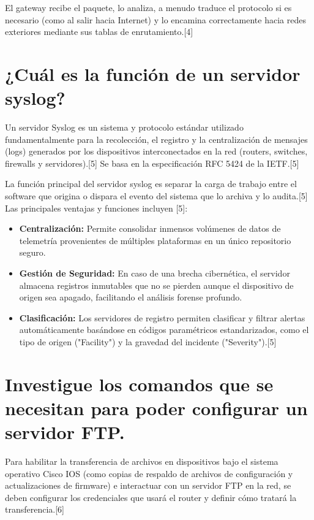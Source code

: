 \documentclass[a4paper,12pt]{article}
\begin{document}
El gateway recibe el paquete, lo analiza, a menudo traduce el protocolo si es necesario (como al salir hacia Internet) y lo encamina correctamente hacia redes exteriores mediante sus tablas de enrutamiento.[4]


\newpage
\section{¿Cuál es la función de un servidor syslog?}

Un servidor Syslog es un sistema y protocolo estándar utilizado fundamentalmente para la recolección, el registro y la centralización de mensajes (logs) generados por los dispositivos interconectados en la red (routers, switches, firewalls y servidores).[5] Se basa en la especificación RFC 5424 de la IETF.[5]

La función principal del servidor syslog es separar la carga de trabajo entre el software que origina o dispara el evento del sistema que lo archiva y lo audita.[5] Las principales ventajas y funciones incluyen [5]:
\begin{itemize}
    \item \textbf{Centralización:} Permite consolidar inmensos volúmenes de datos de telemetría provenientes de múltiples plataformas en un único repositorio seguro.
    \item \textbf{Gestión de Seguridad:} En caso de una brecha cibernética, el servidor almacena registros inmutables que no se pierden aunque el dispositivo de origen sea apagado, facilitando el análisis forense profundo.
    \item \textbf{Clasificación:} Los servidores de registro permiten clasificar y filtrar alertas automáticamente basándose en códigos paramétricos estandarizados, como el tipo de origen ("Facility") y la gravedad del incidente ("Severity").[5]
\end{itemize}


\newpage
\section{Investigue los comandos que se necesitan para poder configurar un servidor FTP.}

Para habilitar la transferencia de archivos en dispositivos bajo el sistema operativo Cisco IOS (como copias de respaldo de archivos de configuración y actualizaciones de firmware) e interactuar con un servidor FTP en la red, se deben configurar los credenciales que usará el router y definir cómo tratará la transferencia.[6]
\end{document}

